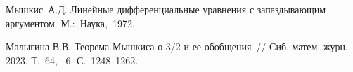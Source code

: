 
%

\begin{thebibliography}{9} %
 Мышкис~А.Д. Линейные дифференциальные уравнения с запаздывающим аргументом. М.:~Наука,~1972.



 Малыгина В.В. Теорема Мышкиса о 3/2 и ее обобщения~// Сиб. матем. журн. 2023. Т.~64, \textnumero~6. С.~1248--1262.



\end{thebibliography}





%